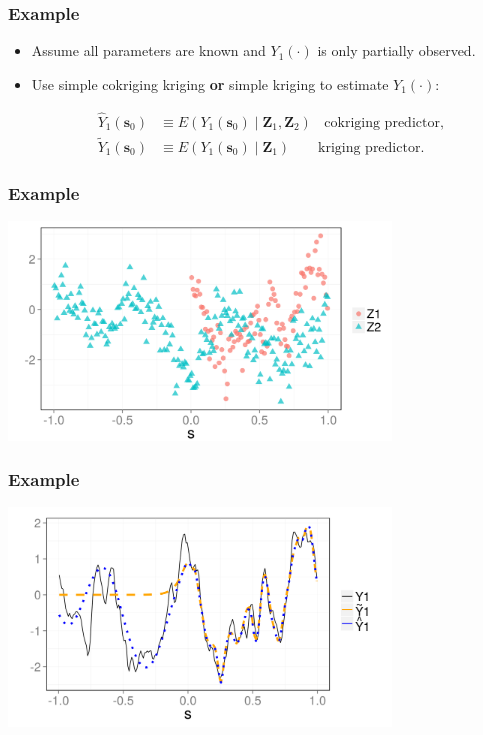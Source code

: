 \documentclass{beamer}
\newcommand{\svec} {\textbf{s}}
\newcommand{\Zvec}{\mathbf{Z}}
\newcommand{\E}{E}
\begin{document}
\begin{frame}
\frametitle{Example}

\begin{itemize}
\item Assume all parameters are known and $Y_1(\cdot)$ is only partially observed. \vfill
\item Use simple cokriging kriging {\bf or} simple kriging to estimate $Y_1(\cdot)$:

\begin{align*}
\hat Y_1(\svec_0) &\equiv \E(Y_1(\svec_0) \mid  \Zvec_1, \Zvec_2)~~~~\textrm{cokriging predictor}, \\
\widetilde Y_1(\svec_0) &\equiv \E(Y_1(\svec_0) \mid  \Zvec_1)~~~~~~~~~\textrm{kriging predictor}.
\end{align*}\vfill
\end{itemize}

\end{frame}


\begin{frame}
\frametitle{Example}
\begin{center}
\includegraphics[width=4in]{./sim_obs.png}
\end{center}
\end{frame}


\begin{frame}
\frametitle{Example}
\begin{center}
\includegraphics[width=4in]{./sim_est.png}
\end{center}
\end{frame}
\end{document}
